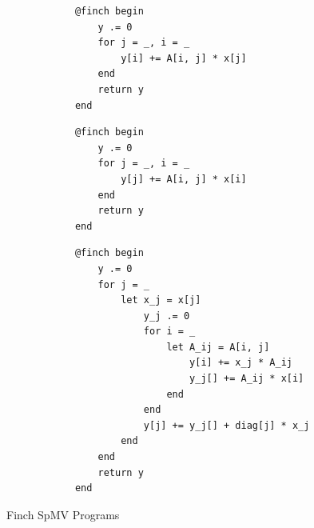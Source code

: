 \begin{figure}
    \begin{minipage}[t]{0.315\textwidth}
        \vspace{0pt} %
        \begin{verbatim}
            @finch begin
                y .= 0
                for j = _, i = _
                    y[i] += A[i, j] * x[j]
                end
                return y
            end
        \end{verbatim}
    \end{minipage}%
    \begin{minipage}[t]{0.315\textwidth}
        \vspace{0pt} %
        \begin{verbatim}
            @finch begin
                y .= 0
                for j = _, i = _
                    y[j] += A[i, j] * x[i]
                end
                return y
            end
        \end{verbatim}
    \end{minipage}
    \begin{minipage}[t]{0.36\textwidth}
        \vspace{0pt} %
        \begin{verbatim}
            @finch begin
                y .= 0
                for j = _
                    let x_j = x[j]
                        y_j .= 0
                        for i = _
                            let A_ij = A[i, j]
                                y[i] += x_j * A_ij
                                y_j[] += A_ij * x[i]
                            end
                        end
                        y[j] += y_j[] + diag[j] * x_j
                    end
                end
                return y
            end
        \end{verbatim}
    \end{minipage}
    \caption{Finch SpMV Programs}
    \label{spmv_programs}
\end{figure}



